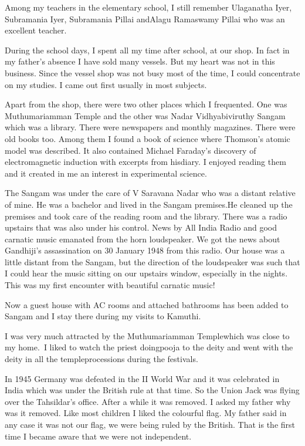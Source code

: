 Among my teachers in the elementary school, I still remember Ulaganatha
Iyer, Subramania Iyer, Subramania Pillai and\break Alagu Ramaswamy Pillai who
was an excellent teacher.

During the school days, I spent all my time after school, at our shop. 
In fact in my father's absence I have sold many vessels. But my heart was 
not in this business. Since the vessel shop was not busy most of the 
time, I could concentrate on my studies. I came out first usually in 
most subjects.

Apart from the shop, there were two other places which I frequen\-ted. One 
was Muthumariamman Temple and the other was Nadar Vidhyabiviruthy Sangam 
which was a library. There were newspapers and monthly magazines. There 
were old books too. Among them I found a book of science where Thomson's 
atomic model was described. It also contained Michael Faraday's\break 
discovery of electromagnetic induction with excerpts from his\break diary. I 
enjoyed reading them and it created in me an interest in experimental science.

The Sangam was under the care of V Saravana Nadar who was a distant 
relative of mine. He was a bachelor and lived in the Sangam premises.He 
cleaned up the premises and took care of the reading room and the 
library. There was a radio upstairs that was also under his control. 
News by All India Radio and good carnatic music emanated from the horn 
loudspeaker. We got the news about Gandhiji's assassination on 30 
January 1948 from this radio. Our house was a little distant from the 
Sangam, but the direction of the loudspeaker was such that I could hear 
the music sitting on our upstairs window, especially in the nights. 
This was my first encounter with beautiful carnatic music!

Now a guest house with AC rooms and attached bathrooms has been added to 
Sangam and I stay there during my visits to Kamuthi.


I was very much attracted by the Muthumariamman Temple\break which was close 
to my home.\ I liked to watch the priest doing\break pooja to the deity and 
went with the deity in all the temple\break processions during the festivals.
  
In 1945 Germany was defeated in the II World War and it was celebrated 
in India which was under the British rule at that time. So the Union 
Jack was flying over the Tahsildar's office. After a while it was 
removed. I asked my father why was it removed. Like most children I 
liked the colourful flag. My father said in any case it was not our 
flag, we were being ruled by the British. That is the first time I 
became aware that we were not independent.

